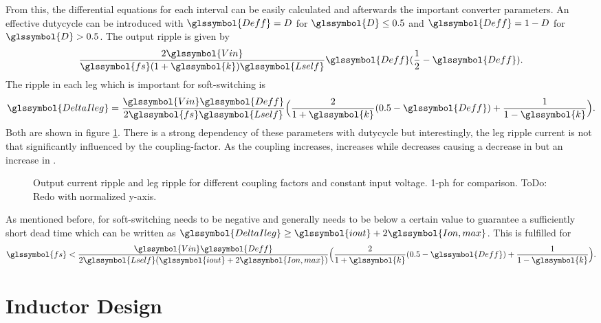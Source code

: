 \documentclass{IPEC2026}
\newcommand{\sbl}[1]{\glssymbol{#1}}
\begin{document}
From this, the differential equations for each interval can be easily calculated and afterwards the important converter parameters. An effective dutycycle \sbl{Deff} can be introduced with $\sbl{Deff} = D$ for $\sbl{D} \leq 0.5$ and $\sbl{Deff} = 1-D$ for $\sbl{D} > 0.5$.
The output ripple is given by
\begin{equation}
  \frac{2\sbl{Vin}}{\sbl{fs}(1+\sbl{k})\sbl{Lself}}\sbl{Deff}(\frac{1}{2}-\sbl{Deff}).
\end{equation}
The ripple in each leg which is important for soft-switching is
\begin{equation}
  \sbl{DeltaIleg} =  \frac{\sbl{Vin}\sbl{Deff}}{2\sbl{fs}\sbl{Lself}} \Bigl (\frac{2}{1+\sbl{k}}(0.5-\sbl{Deff}) + \frac{1}{1-\sbl{k}} \Bigr )  .
\end{equation}
Both are shown in figure \ref{fig:OutputAndLegRipple}. There is a strong dependency of these parameters with dutycycle but interestingly, the leg ripple current is not that significantly influenced by the coupling-factor. As the coupling increases, \sbl{Lout} increases while \sbl{Lm} decreases causing a decrease in \sbl{iout} but an increase in \sbl{im}.
\begin{figure}
  \centering
  
  
  \caption{Output current ripple and leg ripple for different coupling factors and constant input voltage. 1-ph for comparison. ToDo: Redo with normalized y-axis.}
  \label{fig:OutputAndLegRipple}
\end{figure}

As mentioned before, for soft-switching \sbl{Ion} needs to be negative and generally needs to be below a certain value to guarantee a sufficiently short dead time which can be written as $\sbl{DeltaIleg} \geq \sbl{iout}+2\sbl{Ion,max}$. This is fulfilled for
\begin{equation}
    \sbl{fs} < \frac{\sbl{Vin}\sbl{Deff}}{2\sbl{Lself}(\sbl{iout}+2\sbl{Ion,max})} \Bigl (\frac{2}{1+\sbl{k}}(0.5-\sbl{Deff}) + \frac{1}{1-\sbl{k}} \Bigr ).
    \label{eq:ConditionZVS}
\end{equation}

\section{Inductor Design}
\end{document}
